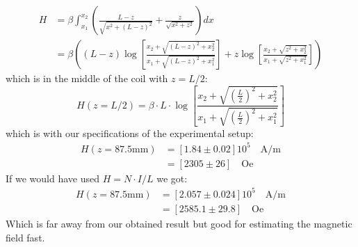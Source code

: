 \begin{align}
    H &= \beta  \int^{x_2}_{x_1} \left (  \frac{L - z}{\sqrt{x^2 + (L-z)^2}} +
      \frac{z}{\sqrt{x^2 + z^2}}    \right ) dx  \\
  &= \beta  \left (
  (L-z) \log{\left [ \frac{x_2 + \sqrt{(L-z)^2 + x_2^2}} { x_1 + \sqrt{(L-z)^2 + x_1^2}} \right]}
  +z \log{\left [ \frac{x_2 + \sqrt{z^2 + x_2^2}} { x_1 + \sqrt{z^2 + x_1^2}} \right]}
  \right)
\end{align}
which is in the middle of the coil with $z = L/2$:
\begin{equation}
    H(z = L/2) = \beta \cdot L \cdot
    \log{\left [ \frac{x_2 + \sqrt{(\frac{L}{2})^2+ x_2^2}} { x_1 + \sqrt{(\frac{L}{2})^2 + x_1^2}} \right]}
\end{equation}
which is with our specifications of the experimental setup:
\begin{align}
    H( z = 87.5 \mathrm{mm}) &=   \left [ 1.84 \pm 0.02\right ] 10^5\quad  \mathrm{A/m} \\
         &=  \left [ 2305 \pm 26\right ] \quad \mathrm{Oe}
\end{align}
If we would have used $H= N \cdot I / L$ we got:
\begin{align}
    H( z = 87.5 \mathrm{mm}) &=   \left [ 2.057 \pm 0.024\right ] 10^5\quad  \mathrm{A/m} \\
         &=  \left [ 2585.1\pm29.8\right ] \quad \mathrm{Oe}
\end{align}
Which is far away from our obtained result but good for estimating the magnetic field fast.
